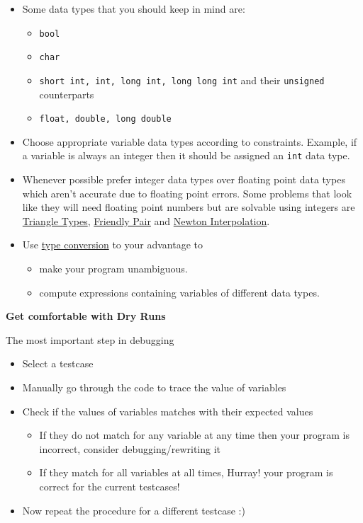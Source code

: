 \documentclass[../Problems]{subfiles}
\begin{document}
\begin{itemize}
\item Some data types that you should keep in mind are:
	\begin{itemize}
	\item \verb!bool!
	\item \verb!char!
	\item \verb!short int, int, long int, long long int! and their \verb!unsigned! counterparts
	\item \verb!float, double, long double!
	\end{itemize}
\item Choose appropriate variable data types according to constraints. Example, if a variable is always an integer then it should be assigned an \verb!int! data type.
\item Whenever possible prefer integer data types over floating point data types which aren't accurate due to floating point errors. Some problems that look like they will need floating point numbers but are solvable using integers are \hyperref[pp:triangletypes]{Triangle Types}, \hyperref[pp:friendlypair]{Friendly Pair} and \hyperref[pp:newtoninterpolation]{Newton Interpolation}.
\item Use \href{https://www.geeksforgeeks.org/type-conversion-in-c/}{type conversion} to your advantage to
	\begin{itemize}
	\item make your program unambiguous.
	\item compute expressions containing variables of different data types.
	\end{itemize}
\end{itemize}
\begin{center}
	\textbf{\large{Get comfortable with Dry Runs}}
\end{center}
The most important step in debugging
\begin{itemize}	
\item Select a testcase
\item Manually go through the code to trace the value of variables
\item Check if the values of variables matches with their expected values
\begin{itemize}
	\item If they do not match for any variable at any time then your program is incorrect, consider debugging/rewriting it
	\item If they match for all variables at all times, Hurray! your program is correct for the current testcases!
\end{itemize}
\item Now repeat the procedure for a different testcase :)
\end{itemize}
\end{document}
